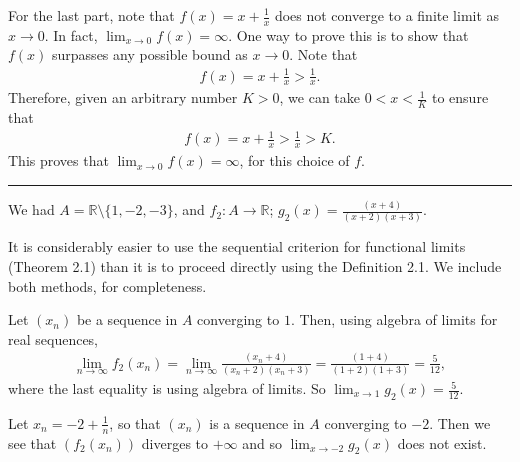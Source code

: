 \documentclass[letterpaper,10pt,english]{jupyterBook}
\begin{document}
\sphinxAtStartPar
For the last part, note that \(f(x)=x+\frac{1}{x}\) does not converge to a finite limit as \(x\rightarrow 0\). In fact, \(\lim_{x\rightarrow 0}f(x)=\infty\). One way to prove this is to show that \(f(x)\) surpasses any possible bound as \(x\rightarrow 0\). Note that
\begin{equation*}
\begin{split}
f(x) = x+\frac{1}{x} > \frac{1}{x}.
\end{split}
\end{equation*}
\sphinxAtStartPar
Therefore, given an arbitrary number \(K>0\), we can take \(0<x<\frac{1}{K}\) to ensure that
\begin{equation*}
\begin{split}
f(x) = x+\frac{1}{x} > \frac{1}{x} > K.
\end{split}
\end{equation*}
\sphinxAtStartPar
This proves that \(\lim_{x\rightarrow 0} f(x) = \infty\), for this choice of \(f\).


\bigskip\hrule\bigskip


\sphinxAtStartPar
{\hyperref[\detokenize{Problems:id4}]{}} We had \(A= \mathbb{R} \setminus \{1, -2, -3\}\), and \(f_2:A\to\mathbb{R}\); \(\displaystyle g_{2}(x)= \frac{(x + 4)}{(x + 2)(x + 3)}\).

\sphinxAtStartPar
It is considerably easier to use the sequential criterion for functional limits (Theorem 2.1) than it is to proceed directly using the Definition 2.1. We include both methods, for completeness.

\sphinxAtStartPar
{} 
Let \((x_n)\) be a sequence in \(A\) converging to \(1\). Then, using algebra of limits for real sequences,
\begin{equation*}
\begin{split}
\lim_{n\to\infty}f_2(x_n)= \lim_{n\to\infty} \frac{(x_n + 4)}{(x_n + 2)(x_n + 3)} =  \frac{(1 + 4)}{(1 + 2)(1 + 3)} = \frac{5}{12},
\end{split}
\end{equation*}
\sphinxAtStartPar
where the last equality is using algebra of limits. So \(\displaystyle\lim_{x \rightarrow 1}g_{2}(x) = \frac{5}{12}\).

\sphinxAtStartPar
Let \(x_n=-2 + \frac{1}{n}\), so that \((x_n)\) is a sequence in \(A\) converging to \(-2\). Then we see that \((f_2(x_n))\) diverges to \(+\infty\) and so \(\lim_{x \rightarrow -2}g_{2}(x)\)  does not exist.
\end{document}
